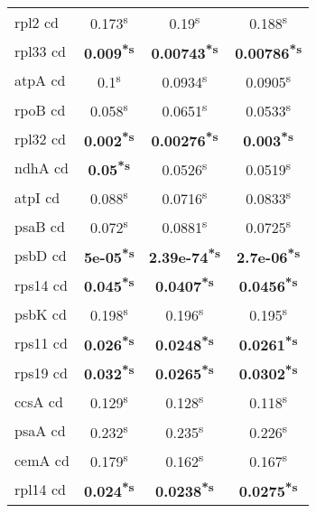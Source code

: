 \documentclass[a4paper]{article}
\begin{document}
\begin{longtable}{l|c|c|c}
rpl2 cd&0.173\textsuperscript{s}&0.19\textsuperscript{s}&0.188\textsuperscript{s}\\
rpl33 cd&\textbf{0.009\textsuperscript{*}\textsuperscript{s}}&\textbf{0.00743\textsuperscript{*}\textsuperscript{s}}&\textbf{0.00786\textsuperscript{*}\textsuperscript{s}}\\
atpA cd&0.1\textsuperscript{s}&0.0934\textsuperscript{s}&0.0905\textsuperscript{s}\\
rpoB cd&0.058\textsuperscript{s}&0.0651\textsuperscript{s}&0.0533\textsuperscript{s}\\
rpl32 cd&\textbf{0.002\textsuperscript{*}\textsuperscript{s}}&\textbf{0.00276\textsuperscript{*}\textsuperscript{s}}&\textbf{0.003\textsuperscript{*}\textsuperscript{s}}\\
ndhA cd&\textbf{0.05\textsuperscript{*}\textsuperscript{s}}&0.0526\textsuperscript{s}&0.0519\textsuperscript{s}\\
atpI cd&0.088\textsuperscript{s}&0.0716\textsuperscript{s}&0.0833\textsuperscript{s}\\
psaB cd&0.072\textsuperscript{s}&0.0881\textsuperscript{s}&0.0725\textsuperscript{s}\\
psbD cd&\textbf{5e-05\textsuperscript{*}\textsuperscript{s}}&\textbf{2.39e-74\textsuperscript{*}\textsuperscript{s}}&\textbf{2.7e-06\textsuperscript{*}\textsuperscript{s}}\\
rps14 cd&\textbf{0.045\textsuperscript{*}\textsuperscript{s}}&\textbf{0.0407\textsuperscript{*}\textsuperscript{s}}&\textbf{0.0456\textsuperscript{*}\textsuperscript{s}}\\
psbK cd&0.198\textsuperscript{s}&0.196\textsuperscript{s}&0.195\textsuperscript{s}\\
rps11 cd&\textbf{0.026\textsuperscript{*}\textsuperscript{s}}&\textbf{0.0248\textsuperscript{*}\textsuperscript{s}}&\textbf{0.0261\textsuperscript{*}\textsuperscript{s}}\\
rps19 cd&\textbf{0.032\textsuperscript{*}\textsuperscript{s}}&\textbf{0.0265\textsuperscript{*}\textsuperscript{s}}&\textbf{0.0302\textsuperscript{*}\textsuperscript{s}}\\
ccsA cd&0.129\textsuperscript{s}&0.128\textsuperscript{s}&0.118\textsuperscript{s}\\
psaA cd&0.232\textsuperscript{s}&0.235\textsuperscript{s}&0.226\textsuperscript{s}\\
cemA cd&0.179\textsuperscript{s}&0.162\textsuperscript{s}&0.167\textsuperscript{s}\\
rpl14 cd&\textbf{0.024\textsuperscript{*}\textsuperscript{s}}&\textbf{0.0238\textsuperscript{*}\textsuperscript{s}}&\textbf{0.0275\textsuperscript{*}\textsuperscript{s}}\\

\end{longtable}
\end{document}
